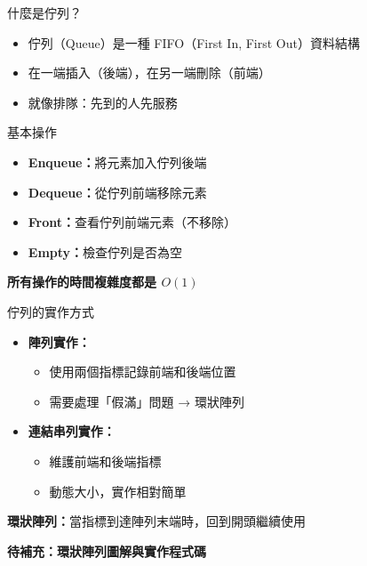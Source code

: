 \documentclass{beamer}
\begin{document}
\begin{frame}{什麼是佇列？}
\begin{itemize}
    \item 佇列（Queue）是一種 FIFO（First In, First Out）資料結構
    \item 在一端插入（後端），在另一端刪除（前端）
    \item 就像排隊：先到的人先服務
\end{itemize}

\vspace{1em}
\begin{block}{基本操作}
\begin{itemize}
    \item \textbf{Enqueue：}將元素加入佇列後端
    \item \textbf{Dequeue：}從佇列前端移除元素
    \item \textbf{Front：}查看佇列前端元素（不移除）
    \item \textbf{Empty：}檢查佇列是否為空
\end{itemize}
\end{block}

\vspace{1em}
\begin{center}
\textbf{所有操作的時間複雜度都是 $O(1)$}
\end{center}
\end{frame}

\begin{frame}{佇列的實作方式}
\begin{itemize}
    \item \textbf{陣列實作：}
    \begin{itemize}
        \item 使用兩個指標記錄前端和後端位置
        \item 需要處理「假滿」問題 → 環狀陣列
    \end{itemize}
    \item \textbf{連結串列實作：}
    \begin{itemize}
        \item 維護前端和後端指標
        \item 動態大小，實作相對簡單
    \end{itemize}
\end{itemize}

\vspace{1em}
\textbf{環狀陣列：}當指標到達陣列末端時，回到開頭繼續使用

\vspace{1em}
\textbf{待補充：環狀陣列圖解與實作程式碼}
\end{frame}
\end{document}
